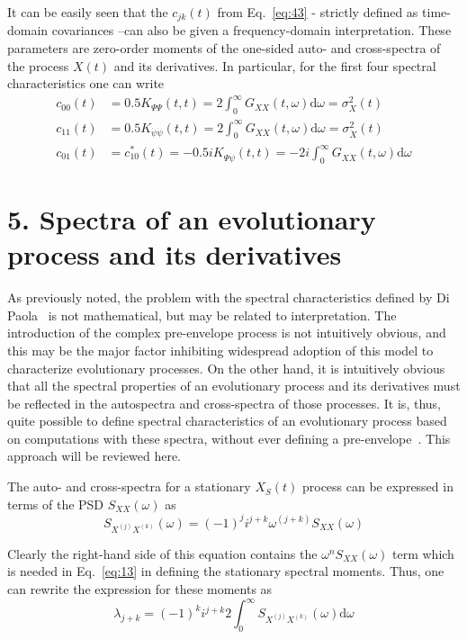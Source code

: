 \documentclass[12pt]{article}
\begin{document}
It can be easily seen that the $c_{j k}(t)$ from Eq.~\eqref{eq:43} - strictly defined as time-domain covariances --can also be given a frequency-domain interpretation. These parameters are zero-order moments
of the one-sided auto- and cross-spectra of the process $X(t)$ and its derivatives. In particular, for the first four spectral characteristics one can write
\begin{align}
c_{00}(t) &=0.5 K_{\Psi \Psi}(t, t)=2 \int_{0}^{\infty} G_{X X}(t, \omega) \mathrm{d} \omega=\sigma_{X}^{2}(t) \nonumber \\
c_{11}(t) &=0.5 K_{\dot{\psi} \dot{\psi}}(t, t)=2 \int_{0}^{\infty} G_{\dot{X} \dot{X}}(t, \omega) \mathrm{d} \omega=\sigma_{\dot{X}}^{2}(t) \nonumber \\
c_{01}(t) &=c_{10}^{*}(t)=-0.5 i K_{\Psi \dot{\psi}}(t, t)=-2 i \int_{0}^{\infty} G_{X \dot{X}}(t, \omega) \mathrm{d} \omega
\label{eq:44}
\end{align}

\section*{5. Spectra of an evolutionary process and its derivatives}

As previously noted, the problem with the spectral characteristics defined by Di Paola~\cite{DiPaola1985} is not mathematical, but may be related to interpretation. The introduction of the complex pre-envelope process is not intuitively obvious, and this may be the major factor inhibiting widespread adoption of this model to characterize evolutionary processes. On the other hand, it is intuitively obvious that all the spectral properties of an evolutionary process and its derivatives must be reflected in the autospectra and cross-spectra of those processes. It is, thus, quite possible to define spectral characteristics of an evolutionary process based on computations with these spectra, without ever defining a pre-envelope~\cite{Michaelov1997}. This approach will be reviewed here.

The auto- and cross-spectra for a stationary $X_{S}(t)$ process can be expressed in terms of the PSD $S_{X X}(\omega)$ as
\begin{equation}
S_{X^{(j)} X^{(k)}}(\omega)=(-1)^{j} i^{j+k} \omega^{(j+k)} S_{X X}(\omega)
\label{eq:45}
\end{equation}

Clearly the right-hand side of this equation contains the $\omega^{n} S_{X X}(\omega)$ term which is needed in Eq.~\eqref{eq:13} in defining the stationary spectral moments. Thus, one can rewrite the expression for these moments as
\begin{equation}
\lambda_{j+k}=(-1)^{k} i^{j+k} 2 \int_{0}^{\infty} S_{X^{(j)} X^{(k)}}(\omega) \mathrm{d} \omega
\label{eq:46}
\end{equation}
\end{document}
